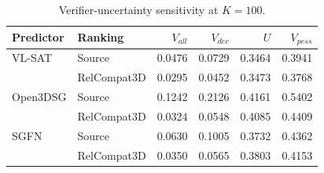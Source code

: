 \begin{table}[t]
\centering\small
\begin{tabular}{@{}llrrrr@{}}
\toprule
Predictor & Ranking & $V_{all}$ & $V_{dec}$ & $U$ & $V_{pess}$ \\
\midrule
VL-SAT & Source & 0.0476 & 0.0729 & 0.3464 & 0.3941 \\
 & RelCompat3D & 0.0295 & 0.0452 & 0.3473 & 0.3768 \\
\midrule
Open3DSG & Source & 0.1242 & 0.2126 & 0.4161 & 0.5402 \\
 & RelCompat3D & 0.0324 & 0.0548 & 0.4085 & 0.4409 \\
\midrule
SGFN & Source & 0.0630 & 0.1005 & 0.3732 & 0.4362 \\
 & RelCompat3D & 0.0350 & 0.0565 & 0.3803 & 0.4153 \\
\bottomrule
\end{tabular}
\caption{Verifier-uncertainty sensitivity at $K=100$.}
\label{tab:no-family-uncertainty}
\end{table}
